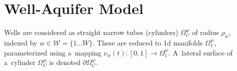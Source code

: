 \section{Well-Aquifer Model}

Wells are considered as straight narrow tubes (cylinders) $\Omega^w_C$ of radius $\rho_w$,
indexed by $w\in\mathcal{W}=\{1\ldots W\}$. These are reduced to 1d manifolds
$\Omega^w_1$, parameterized using a~mapping $\nu_w(t): [0,1] \rightarrow \Omega^w_1$.
A~lateral surface of a~cylinder $\Omega^w_C$ is denoted $\partial\Omega^w_C$.



